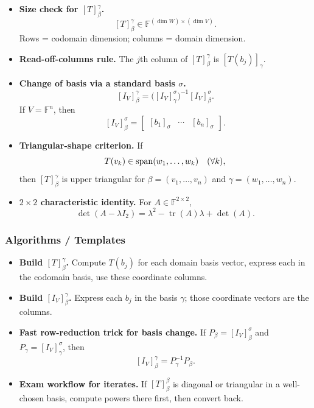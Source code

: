 \begin{itemize}[leftmargin=*]
\item \textbf{Size check for $[T]^{\gamma}_{\beta}$.}
\[
[T]^{\gamma}_{\beta}\in\mathbb F^{(\dim W)\times(\dim V)}.
\]
Rows = codomain dimension; columns = domain dimension.

\item \textbf{Read-off-columns rule.} The $j$th column of $[T]^{\gamma}_{\beta}$ is $[T(b_j)]_\gamma$.

\item \textbf{Change of basis via a standard basis $\sigma$.}
\[
[I_V]^{\gamma}_{\beta}=\bigl([I_V]^{\sigma}_{\gamma}\bigr)^{-1}[I_V]^{\sigma}_{\beta}.
\]
If $V=\mathbb F^n$, then
\[
[I_V]^{\sigma}_{\beta}=
\begin{bmatrix}[b_1]_\sigma&\cdots&[b_n]_\sigma\end{bmatrix}.
\]

\item \textbf{Triangular-shape criterion.} If
\[
T(v_k)\in\operatorname{span}(w_1,\dots,w_k)\quad(\forall k),
\]
then $[T]^{\gamma}_{\beta}$ is upper triangular for $\beta=(v_1,\dots,v_n)$ and $\gamma=(w_1,\dots,w_n)$.

\item \textbf{$2\times 2$ characteristic identity.} For $A\in\mathbb F^{2\times 2}$,
\[
\det(A-\lambda I_2)=\lambda^2-\operatorname{tr}(A)\lambda+\det(A).
\]
\end{itemize}

\subsubsection*{Algorithms / Templates}

\begin{itemize}[leftmargin=*]
\item \textbf{Build $[T]^{\gamma}_{\beta}$.} Compute $T(b_j)$ for each domain basis vector, express each in the codomain basis, use these coordinate columns.

\item \textbf{Build $[I_V]^{\gamma}_{\beta}$.} Express each $b_j$ in the basis $\gamma$; those coordinate vectors are the columns.

\item \textbf{Fast row-reduction trick for basis change.} If $P_\beta=[I_V]^{\sigma}_{\beta}$ and $P_\gamma=[I_V]^{\sigma}_{\gamma}$, then
\[
[I_V]^{\gamma}_{\beta}=P_\gamma^{-1}P_\beta.
\]

\item \textbf{Exam workflow for iterates.} If $[T]^{\beta}_{\beta}$ is diagonal or triangular in a well-chosen basis, compute powers there first, then convert back.
\end{itemize}

